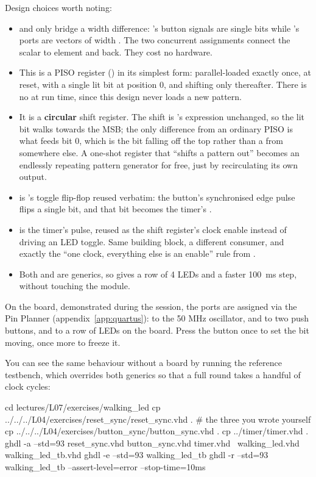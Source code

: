 Design choices worth noting:
\begin{itemize}
  \item {} and  only bridge a width difference:
    's button signals are single bits while 's ports are vectors
    of width . The two concurrent assignments connect the scalar to element  and
    back. They cost no hardware.
  \item This is a PISO register () in its simplest form: parallel-loaded exactly
    once, at reset, with a single lit bit at position 0, and shifting only thereafter. There is no
     at run time, since this design never loads a new pattern.
  \item It is a \textbf{circular} shift register. The shift is 's expression
    unchanged, so the lit bit walks towards the MSB; the only difference from an ordinary PISO is
    what feeds bit 0, which is the bit falling off the top rather than a  from
    somewhere else. A one-shot register that ``shifts a pattern out'' becomes an endlessly repeating
    pattern generator for free, just by recirculating its own output.
  \item {} is 's toggle flip-flop reused verbatim: the
    button's synchronised edge pulse flips a single bit, and that bit becomes the timer's
    .
  \item {} is the timer's  pulse, reused as the shift register's clock
    enable instead of driving an LED toggle. Same building block, a different consumer, and exactly
    the ``one clock, everything else is an enable'' rule from .
  \item Both  and  are generics, so
     gives a row of 4 LEDs and  a
    faster 100~ms step, without touching the module.
\end{itemize}

On the board, demonstrated during the session, the ports are assigned via the Pin Planner
(appendix~\ref{app:quartus}):  to the 50 MHz oscillator,  and
 to two push buttons, and  to a row of LEDs on the board. Press the button
once to set the bit moving, once more to freeze it.

You can see the same behaviour without a board by running the reference testbench, which overrides
both generics so that a full round takes a handful of clock cycles:

\begin{shell}
cd lectures/L07/exercises/walking_led
cp ../../../L04/exercises/reset_sync/reset_sync.vhd .   # the three you wrote yourself
cp ../../../L04/exercises/button_sync/button_sync.vhd .
cp ../timer/timer.vhd .
ghdl -a --std=93 reset_sync.vhd button_sync.vhd timer.vhd \
                 walking_led.vhd walking_led_tb.vhd
ghdl -e --std=93 walking_led_tb
ghdl -r --std=93 walking_led_tb --assert-level=error --stop-time=10ms
\end{shell}
